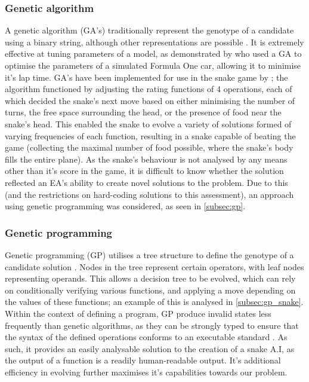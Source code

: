 \documentclass[british,10pt,a4paper]{article}
\begin{document}
\subsubsection{Genetic algorithm}
A genetic algorithm (GA's) traditionally represent the genotype of a candidate using a binary string, although other representations are possible \cite{Whitley1994-tx}. It is extremely effective at tuning parameters of a model, as demonstrated by \citet{Wloch2004-vo} who used a GA to optimise the parameters of a simulated Formula One car, allowing it to minimise it's lap time. GA's have been implemented for use in the snake game by \citet{Yeh2016-ts}; the algorithm functioned by adjusting the rating functions of 4 operations, each of which decided the snake's next move based on either minimising the number of turns, the free space surrounding the head, or the presence of food near the snake's head. This enabled the snake to evolve a variety of solutions formed of varying frequencies of each function, resulting in a snake capable of beating the game (collecting the maximal number of food possible, where the snake's body fills the entire plane). As the snake's behaviour is not analysed by any means other than it's score in the game, it is difficult to know whether the solution reflected an EA's ability to create novel solutions to the problem. Due to this (and the restrictions on hard-coding solutions to this assessment), an approach using genetic programming was considered, as seen in \autoref{subsec:gp}.

\subsubsection{Genetic programming}
\label{subsec:gp}
Genetic programming (GP) utilises a tree structure to define the genotype of a candidate solution \cite{Cramer_undated-bj}. Nodes in the tree represent certain operators, with leaf nodes representing operands. This allows a decision tree to be evolved, which can rely on conditionally verifying various functions, and applying a move depending on the values of these functions; an example of this is analysed in \autoref{subsec:gp_snake}. Within the context of defining a program, GP produce invalid states less frequently than genetic algorithms, as they can be strongly typed to ensure that the syntax of the defined operations conforms to an executable standard \cite{Chen2012-ei}. As such, it provides an easily analysable solution to the creation of a snake A.I, as the output of a function is a readily human-readable output. It's additional efficiency in evolving further maximises it's capabilities towards our problem.
\end{document}
